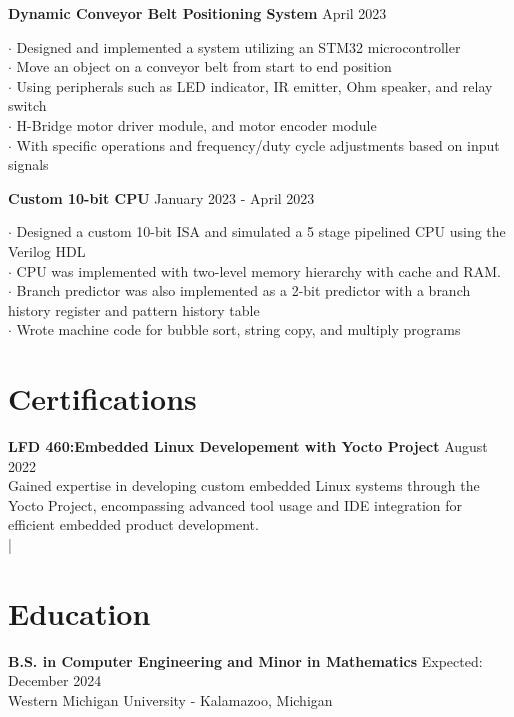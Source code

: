 \documentclass[letter,12pt]{article}
\begin{document}
\vspace{-.5cm}
\begin{tcolorbox}
[colback=gray!25,
  leftrule=0pt,
  rightrule=0pt,
  sharp corners]
\noindent\textbf{Dynamic Conveyor Belt Positioning System} 
  \hfill April 2023 
\end{tcolorbox}
\noindent
$\cdot$ Designed and implemented a system utilizing an STM32 microcontroller \\
$\cdot$ Move an object on a conveyor belt from start to end position \\
$\cdot$ Using peripherals such as LED indicator, IR emitter, Ohm speaker, and relay switch\\
$\cdot$ H-Bridge motor driver module, and motor encoder module \\
$\cdot$ With specific operations and frequency/duty cycle adjustments based on input signals \\

\vspace{-.5cm}

\begin{tcolorbox}
[colback=gray!25,
  leftrule=0pt,
  rightrule=0pt,
  sharp corners]
\textbf{Custom 10-bit CPU} 
\hfill January 2023 - April 2023 
\end{tcolorbox}
\noindent
$\cdot$ Designed a custom 10-bit ISA and simulated a 5 stage pipelined CPU using the Verilog HDL \\
$\cdot$ CPU was implemented with two-level memory hierarchy with cache and RAM. \\
$\cdot$ Branch predictor was also implemented as a 2-bit predictor with a branch history register and
pattern history table\\
$\cdot$ Wrote machine code for bubble sort, string copy, and multiply programs
\vspace{-.75cm}

\section*{Certifications}
\vspace{-.25cm}
\textbf{LFD 460:Embedded Linux Developement with Yocto
Project} \hfill August 2022\\ 
Gained expertise in developing custom embedded Linux systems through the Yocto Project, encompassing advanced tool usage and IDE integration for efficient embedded product development.\\
\href{https://www.credly.com/badges/2a1ad89a-9c46-4145-a715-128f7a8fd1db/public_url}
{} |
\href{https://ti-user-certificates.s3.amazonaws.com/e0df7fbf-a057-42af-8a1f-590912be5460/fcc7abec-e782-4b52-a893-697157cb2e3b-dylan-garza-9cd517ca-cff3-4ee2-898e-4173cb45d893-certificate.pdf}
{}

\vspace{-.5cm}

\section*{Education} 
\vspace{-.25cm}
\textbf{B.S. in Computer Engineering and Minor in Mathematics} 
\hfill Expected: December 2024\\
Western Michigan University - Kalamazoo, Michigan\\ 

\end{document}
